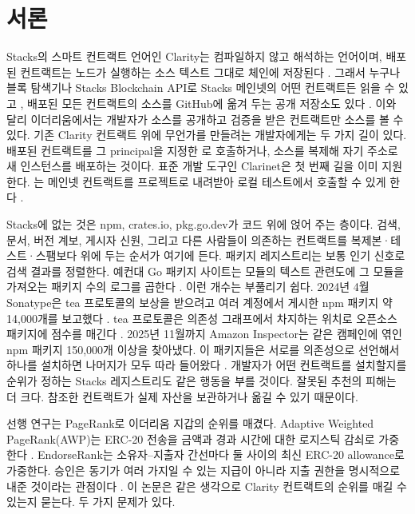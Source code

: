 \section{서론}
\label{sec:introduction}

Stacks의 스마트 컨트랙트 언어인 Clarity는 컴파일하지 않고 해석하는 언어이며, 배포된 컨트랙트는 노드가 실행하는 소스 텍스트 그대로 체인에 저장된다 \cite{sip002,hiro2024nowhere}. 그래서 누구나 블록 탐색기나 Stacks Blockchain API로 Stacks 메인넷의 어떤 컨트랙트든 읽을 수 있고 \cite{hiroapi}, 배포된 모든 컨트랙트의 소스를 GitHub에 옮겨 두는 공개 저장소도 있다 \cite{boomcrypto}. 이와 달리 이더리움에서는 개발자가 소스를 공개하고 검증을 받은 컨트랙트만 소스를 볼 수 있다. 기존 Clarity 컨트랙트 위에 무언가를 만들려는 개발자에게는 두 가지 길이 있다. 배포된 컨트랙트를 그 principal을 지정한 로 호출하거나, 소스를 복제해 자기 주소로 새 인스턴스를 배포하는 것이다. 표준 개발 도구인 Clarinet은 첫 번째 길을 이미 지원한다. 는 메인넷 컨트랙트를 프로젝트로 내려받아 로컬 테스트에서 호출할 수 있게 한다 \cite{clarinet}.

Stacks에 없는 것은 npm, crates.io, pkg.go.dev가 코드 위에 얹어 주는 층이다. 검색, 문서, 버전 계보, 게시자 신원, 그리고 다른 사람들이 의존하는 컨트랙트를 복제본·테스트·스팸보다 위에 두는 순서가 여기에 든다. 패키지 레지스트리는 보통 인기 신호로 검색 결과를 정렬한다. 예컨대 Go 패키지 사이트는 모듈의 텍스트 관련도에 그 모듈을 가져오는 패키지 수의 로그를 곱한다 \cite{pkgsite}. 이런 개수는 부풀리기 쉽다. 2024년 4월 Sonatype은 tea 프로토콜의 보상을 받으려고 여러 계정에서 게시한 npm 패키지 약 14,000개를 보고했다 \cite{sonatype2024tea}. tea 프로토콜은 의존성 그래프에서 차지하는 위치로 오픈소스 패키지에 점수를 매긴다 \cite{tea2022}. 2025년 11월까지 Amazon Inspector는 같은 캠페인에 엮인 npm 패키지 150,000개 이상을 찾아냈다. 이 패키지들은 서로를 의존성으로 선언해서 하나를 설치하면 나머지가 모두 따라 들어왔다 \cite{aws2025tea}. 개발자가 어떤 컨트랙트를 설치할지를 순위가 정하는 Stacks 레지스트리도 같은 행동을 부를 것이다. 잘못된 추천의 피해는 더 크다. 참조한 컨트랙트가 실제 자산을 보관하거나 옮길 수 있기 때문이다.

선행 연구는 PageRank로 이더리움 지갑의 순위를 매겼다. Adaptive Weighted PageRank(AWP)는 ERC-20 전송을 금액과 경과 시간에 대한 로지스틱 감쇠로 가중한다 \cite{do2023awp}. EndorseRank는 소유자--지출자 간선마다 둘 사이의 최신 ERC-20 allowance로 가중한다. 승인은 동기가 여러 가지일 수 있는 지급이 아니라 지출 권한을 명시적으로 내준 것이라는 관점이다 \cite{kwon2026endorserank}. 이 논문은 같은 생각으로 Clarity 컨트랙트의 순위를 매길 수 있는지 묻는다. 두 가지 문제가 있다.

